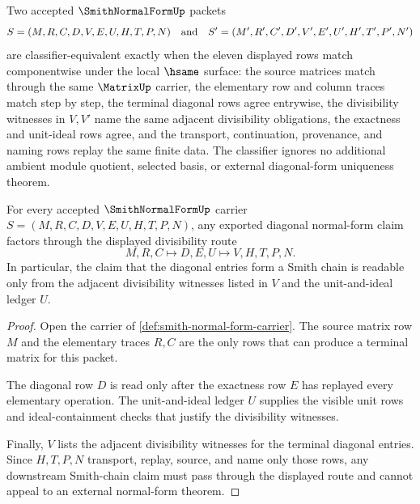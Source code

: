 \begin{definition}
\label{def:smith-normal-form-classifier}
Two accepted $\SmithNormalFormUp$ packets
$$
S=(M,R,C,D,V,E,U,H,T,P,N)
\quad\hbox{and}\quad
S'=(M',R',C',D',V',E',U',H',T',P',N')
$$
are classifier-equivalent exactly when the eleven displayed rows match componentwise under the local $\hsame$ surface: the source matrices match through the same $\MatrixUp$ carrier, the elementary row and column traces match step by step, the terminal diagonal rows agree entrywise, the divisibility witnesses in $V,V'$ name the same adjacent divisibility obligations, the exactness and unit-ideal rows agree, and the transport, continuation, provenance, and naming rows replay the same finite data. The classifier ignores no additional ambient module quotient, selected basis, or external diagonal-form uniqueness theorem.
\end{definition}

\begin{theorem}
\label{thm:smith-normal-form-divisibility-chain}
For every accepted $\SmithNormalFormUp$ carrier $S=(M,R,C,D,V,E,U,H,T,P,N)$, any exported diagonal normal-form claim factors through the displayed divisibility route
$$
M,R,C \longmapsto D,E,U \longmapsto V,H,T,P,N .
$$
In particular, the claim that the diagonal entries form a Smith chain is readable only from the adjacent divisibility witnesses listed in $V$ and the unit-and-ideal ledger $U$.
\end{theorem}
\begin{proof}
Open the carrier of \autoref{def:smith-normal-form-carrier}. The source matrix row $M$ and the elementary traces $R,C$ are the only rows that can produce a terminal matrix for this packet.

The diagonal row $D$ is read only after the exactness row $E$ has replayed every elementary operation. The unit-and-ideal ledger $U$ supplies the visible unit rows and ideal-containment checks that justify the divisibility witnesses.

Finally, $V$ lists the adjacent divisibility witnesses for the terminal diagonal entries. Since $H,T,P,N$ transport, replay, source, and name only those rows, any downstream Smith-chain claim must pass through the displayed route and cannot appeal to an external normal-form theorem.
\end{proof}

